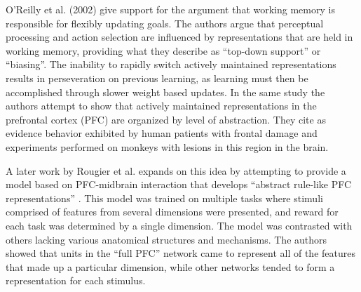 \documentclass[10pt,letterpaper]{article}
\begin{document}

O'Reilly et al. (2002) give support for the argument that working memory is responsible for flexibly updating goals. The authors argue that perceptual processing and action selection are influenced by representations that are held in working memory, providing what they describe as ``top-down support'' or ``biasing''. The inability to rapidly switch actively maintained representations results in perseveration on previous learning, as learning must then be accomplished through slower weight based updates. In the same study the authors attempt to show that actively maintained representations in the prefrontal cortex (PFC) are organized by level of abstraction. They cite as evidence behavior exhibited by human patients with frontal damage and experiments performed on monkeys with lesions in this region in the brain.

A later work by Rougier et al. expands on this idea by attempting to provide a model based on PFC-midbrain interaction that develops ``abstract rule-like PFC representations'' \cite{rougier_prefrontal_2005}. This model was trained on multiple tasks where stimuli comprised of features from several dimensions were presented, and reward for each task was determined by a single dimension. The model was contrasted with others lacking various anatomical structures and mechanisms. The authors showed that units in the ``full PFC'' network came to represent all of the features that made up a particular dimension, while other networks tended to form a representation for each stimulus.

\end{document}
